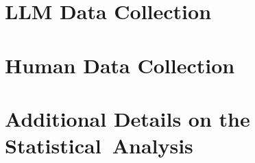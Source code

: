 \section{LLM Data Collection}
\label{app:llm_data}


\section{Human Data Collection}
\label{app:human_data}


\section{Additional Details on the Statistical Analysis}


% 
